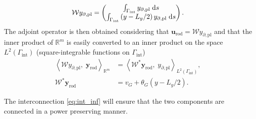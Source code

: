 \documentclass[letterpaper, 10 pt, conference]{ieeeconf}
\begin{document}
\begin{equation}
\mathcal{W} y_{\partial, \text{pl}} = \begin{pmatrix}
\int_{\Gamma_{\text{int}}} y_{\partial, \text{pl}} \d{s} \\
\int_{\Gamma_{\text{int}}} \left( y - L_y/2 \right) y_{\partial, \text{pl}} \d{s} \\
\end{pmatrix}.
\end{equation}
The adjoint operator is then obtained considering that $\bm{u}_{\text{rod}} = \mathcal{W} y_{\partial, \text{pl}}$ and that the inner product of $\mathbb{R}^m$ is easily converted to an inner product on the space $L^2(\Gamma_{\text{int}})$ (square-integrable functions on $\Gamma_{\text{int}}$)
\begin{align*}
\left\langle \mathcal{W} y_{\partial, \text{pl}}, \; \bm{y}_{\text{rod}} \right\rangle_{\mathbb{R}^m} &= \left\langle \mathcal{W}^* \bm{y}_{\text{rod}} , \; y_{\partial, \text{pl}} \right\rangle_{L^2(\Gamma_{\text{int}})}, \\
\mathcal{W}^* \bm{y}_{\text{rod}} &= v_G + \theta_{G} \left( y - L_y/2 \right).
\end{align*}

The interconnection \eqref{eq:int_inf} will ensure that the two components are connected in a power preserving manner.
\end{document}
